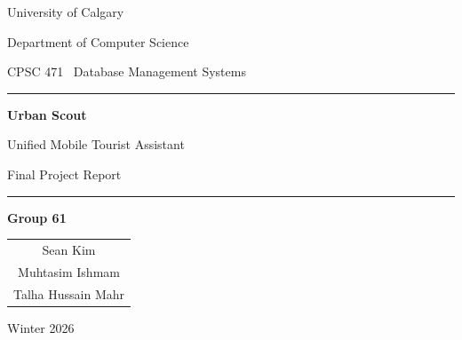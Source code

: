 \begin{titlepage}
    \centering

    \vspace*{1.5cm}

    {\large University of Calgary\par}
    \vspace{0.3cm}
    {\large Department of Computer Science\par}

    \vspace{0.8cm}
    {\Large CPSC 471 \textendash\ Database Management Systems\par}

    \vspace{1.0cm}
    \rule{\linewidth}{0.5mm}

    \vspace{1.2cm}
    {\Huge\bfseries Urban Scout\par}

    \vspace{0.6cm}
    {\LARGE Unified Mobile Tourist Assistant\par}

    \vspace{0.8cm}
    {\Large Final Project Report\par}

    \vspace{1.2cm}
    \rule{\linewidth}{0.5mm}

    \vspace{1.5cm}
    {\Large\bfseries Group 61\par}

    \vspace{1.0cm}
    \begin{tabular}{c}
        \Large Sean Kim \\[0.4em]
        \Large Muhtasim Ishmam \\[0.4em]
        \Large Talha Hussain Mahr \\
    \end{tabular}

    \vfill

    {\large Winter 2026\par}

    \vspace{0.5cm}
\end{titlepage}
